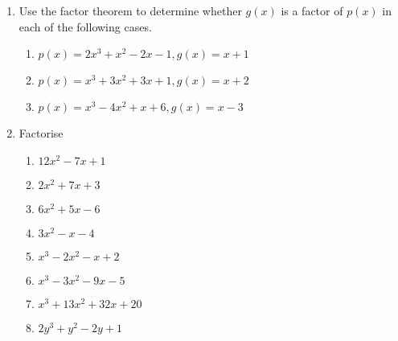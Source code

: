 \begin{enumerate}[label=\thesubsection.\arabic*, ref=\thesubsection.\theenumi,resume*]
\item Use the factor theorem to determine whether $g(x)$ is a factor of $p(x)$ in each of the following cases.
	\begin{enumerate}
		\item $p(x) = 2x^3+x^2-2x-1, g(x) = x+1$
		\item $p(x) = x^3+3x^2+3x+1, g(x) = x+2$
		\item $p(x) = x^3-4x^2+x+6, g(x) = x-3$
	\end{enumerate}
\item Factorise
	\begin{enumerate}
		\item $12x^2-7x + 1$
		\item $2x^2+7x + 3$
		\item $6x^2+5x - 6$
		\item $3x^2-x - 4$
		\item $x^3-2x^2 - x+2$
		\item $x^3-3x^2 - 9x-5$
		\item $x^3+13x^2 +32x+20$
		\item $2y^3+y^2 - 2y+1$
\end{enumerate}
\end{enumerate}
